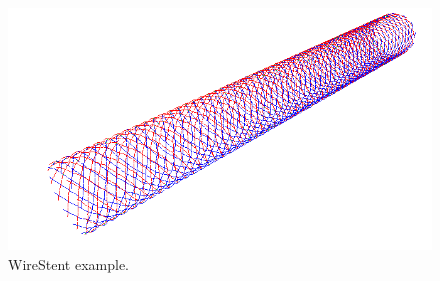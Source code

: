 \begin{figure}[h]
  \centering
  \begin{makeimage}
  \end{makeimage}
  \begin{latexonly}
    \includegraphics[width=12cm]{images/wirestent}
  \end{latexonly}
  \begin{htmlonly}
  \end{htmlonly}  
  \caption{WireStent example.}   \label{fig:WireStent-example}

\end{figure}

